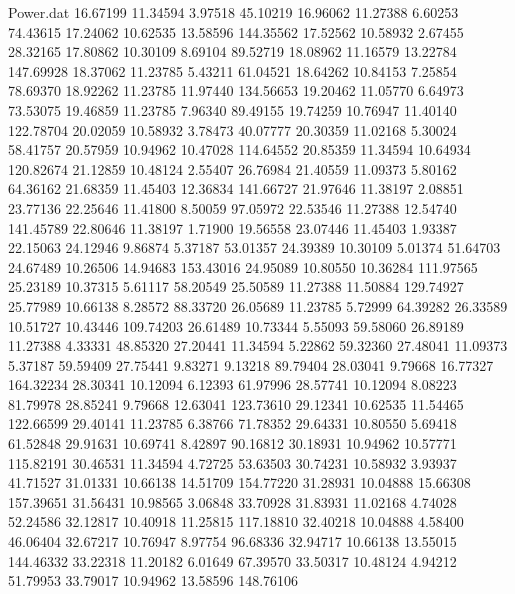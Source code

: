 \begin{filecontents}{Power.dat}
  16.67199   11.34594    3.97518   45.10219
  16.96062   11.27388    6.60253   74.43615
  17.24062   10.62535   13.58596  144.35562
  17.52562   10.58932    2.67455   28.32165
  17.80862   10.30109    8.69104   89.52719
  18.08962   11.16579   13.22784  147.69928
  18.37062   11.23785    5.43211   61.04521
  18.64262   10.84153    7.25854   78.69370
  18.92262   11.23785   11.97440  134.56653
  19.20462   11.05770    6.64973   73.53075
  19.46859   11.23785    7.96340   89.49155
  19.74259   10.76947   11.40140  122.78704
  20.02059   10.58932    3.78473   40.07777
  20.30359   11.02168    5.30024   58.41757
  20.57959   10.94962   10.47028  114.64552
  20.85359   11.34594   10.64934  120.82674
  21.12859   10.48124    2.55407   26.76984
  21.40559   11.09373    5.80162   64.36162
  21.68359   11.45403   12.36834  141.66727
  21.97646   11.38197    2.08851   23.77136
  22.25646   11.41800    8.50059   97.05972
  22.53546   11.27388   12.54740  141.45789
  22.80646   11.38197    1.71900   19.56558
  23.07446   11.45403    1.93387   22.15063
  24.12946    9.86874    5.37187   53.01357
  24.39389   10.30109    5.01374   51.64703
  24.67489   10.26506   14.94683  153.43016
  24.95089   10.80550   10.36284  111.97565
  25.23189   10.37315    5.61117   58.20549
  25.50589   11.27388   11.50884  129.74927
  25.77989   10.66138    8.28572   88.33720
  26.05689   11.23785    5.72999   64.39282
  26.33589   10.51727   10.43446  109.74203
  26.61489   10.73344    5.55093   59.58060
  26.89189   11.27388    4.33331   48.85320
  27.20441   11.34594    5.22862   59.32360
  27.48041   11.09373    5.37187   59.59409
  27.75441    9.83271    9.13218   89.79404
  28.03041    9.79668   16.77327  164.32234
  28.30341   10.12094    6.12393   61.97996
  28.57741   10.12094    8.08223   81.79978
  28.85241    9.79668   12.63041  123.73610
  29.12341   10.62535   11.54465  122.66599
  29.40141   11.23785    6.38766   71.78352
  29.64331   10.80550    5.69418   61.52848
  29.91631   10.69741    8.42897   90.16812
  30.18931   10.94962   10.57771  115.82191
  30.46531   11.34594    4.72725   53.63503
  30.74231   10.58932    3.93937   41.71527
  31.01331   10.66138   14.51709  154.77220
  31.28931   10.04888   15.66308  157.39651
  31.56431   10.98565    3.06848   33.70928
  31.83931   11.02168    4.74028   52.24586
  32.12817   10.40918   11.25815  117.18810
  32.40218   10.04888    4.58400   46.06404
  32.67217   10.76947    8.97754   96.68336
  32.94717   10.66138   13.55015  144.46332
  33.22318   11.20182    6.01649   67.39570
  33.50317   10.48124    4.94212   51.79953
  33.79017   10.94962   13.58596  148.76106

\end{filecontents}
